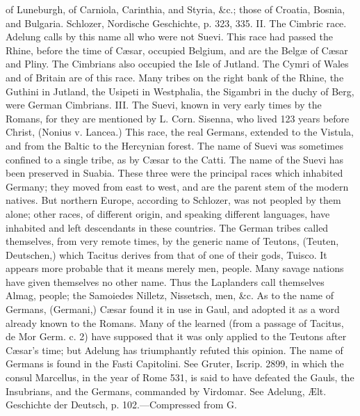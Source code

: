 {of Luneburgh, of Carniola, Carinthia, and Styria, \&c.; those of
Croatia, Bosnia, and Bulgaria. Schlozer, Nordische Geschichte, p.
323, 335. II. The Cimbric race. Adelung calls by this name all
who were not Suevi. This race had passed the Rhine, before the
time of Cæsar, occupied Belgium, and are the Belgæ of Cæsar and
Pliny. The Cimbrians also occupied the Isle of Jutland. The Cymri
of Wales and of Britain are of this race. Many tribes on the
right bank of the Rhine, the Guthini in Jutland, the Usipeti in
Westphalia, the Sigambri in the duchy of Berg, were German
Cimbrians. III. The Suevi, known in very early times by the
Romans, for they are mentioned by L. Corn. Sisenna, who lived 123
years before Christ, (Nonius v. Lancea.) This race, the real
Germans, extended to the Vistula, and from the Baltic to the
Hercynian forest. The name of Suevi was sometimes confined to a
single tribe, as by Cæsar to the Catti. The name of the Suevi has
been preserved in Suabia. These three were the principal races
which inhabited Germany; they moved from east to west, and are
the parent stem of the modern natives. But northern Europe,
according to Schlozer, was not peopled by them alone; other
races, of different origin, and speaking different languages,
have inhabited and left descendants in these countries. The
German tribes called themselves, from very remote times, by the
generic name of Teutons, (Teuten, Deutschen,) which Tacitus
derives from that of one of their gods, Tuisco. It appears more
probable that it means merely men, people. Many savage nations
have given themselves no other name. Thus the Laplanders call
themselves Almag, people; the Samoiedes Nilletz, Nissetsch, men,
\&c. As to the name of Germans, (Germani,) Cæsar found it in use
in Gaul, and adopted it as a word already known to the Romans.
Many of the learned (from a passage of Tacitus, de Mor Germ. c.
2) have supposed that it was only applied to the Teutons after
Cæsar’s time; but Adelung has triumphantly refuted this opinion.
The name of Germans is found in the Fasti Capitolini. See Gruter,
Iscrip. 2899, in which the consul Marcellus, in the year of Rome
531, is said to have defeated the Gauls, the Insubrians, and the
Germans, commanded by Virdomar. See Adelung, Ælt. Geschichte der
Deutsch, p. 102.—Compressed from G.}


